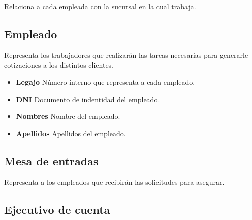 \documentclass[a4paper,11pt]{article}
\begin{document}
Relaciona a cada empleada con la sucursal en la cual trabaja.

\subsection{Empleado}

Representa los trabajadores que realizarán las tareas necesarias para generarle cotizaciones
a los distintos clientes.

\begin{itemize}
   
  \item \textbf{Legajo} Número interno que representa a cada empleado.
  
  \item \textbf{DNI} Documento de indentidad del empleado.
  
  \item \textbf{Nombres} Nombre del empleado.
  
  \item \textbf{Apellidos} Apellidos del empleado.
  
\end{itemize}



   
  
  

\subsection{Mesa de entradas}

Representa a los empleados que recibirán las solicitudes para asegurar.

\subsection{Ejecutivo de cuenta}
\end{document}
